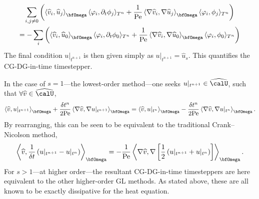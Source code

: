 \begin{example}
\begin{align}
        \end{align}
        \vspace{-8mm}
        \begin{multline}
            \sum_{i, j \neq 0}\left(\left\langle\widehat{v}_{i}, \widehat{u}_{j}\right\rangle_{\bfOmega}\langle\varphi_{i}, \partial_{t}\phi_{j}\rangle_{T^{n}} + \frac{1}{\rmPe}\left\langle\nabla\widehat{v}_{i}, \nabla\widehat{u}_{j}\right\rangle_{\bfOmega}\langle\varphi_{i}, \phi_{j}\rangle_{T^{n}}\right)  \\
            =  - \sum_{i}\left(\left\langle\widehat{v}_{i}, \widehat{u}_{0}\right\rangle_{\bfOmega}\langle\varphi_{i}, \partial_{t}\phi_{0}\rangle_{T^{n}} + \frac{1}{\rmPe}\left\langle\nabla\widehat{v}_{i}, \nabla\widehat{u}_{0}\right\rangle_{\bfOmega}\langle\varphi_{i}, \phi_{0}\rangle_{T^{n}}\right)
        \end{multline}
        The final condition $u|_{t^{n + 1}}$ is then given simply as $u|_{t^{n + 1}}  =  \widehat{u}_{s}$. This quantifies the CG-DG-in-time timestepper.
    \end{example}

    In the case of $s  =  1$---the lowest-order method---one seeks $u|_{t^{n + 1}}  \in  \widehat{\calU}$, such that $\forall \widehat{v}  \in  \widehat{\calU}$,
    \begin{equation}
        \left\langle\widehat{v}, u|_{t^{n + 1}}\right\rangle_{\bfOmega} + \frac{\delta t^{n}}{2\rmPe}\left\langle\nabla\widehat{v}, \nabla u|_{t^{n + 1}}\right\rangle_{\bfOmega}  =  \left\langle\widehat{v}, u|_{t^{n}}\right\rangle_{\bfOmega} - \frac{\delta t^{n}}{2\rmPe}\left\langle\nabla\widehat{v}, \nabla u|_{t^{n}}\right\rangle_{\bfOmega}.
    \end{equation}
    By rearranging, this can be seen to be equivalent to the traditional Crank--Nicolson method,
    \begin{equation}
        \left\langle\widehat{v}, \frac{1}{\delta t}\left(u|_{t^{n + 1}} - u|_{t^{n}}\right)\right\rangle_{\bfOmega}  =  - \frac{1}{\rmPe}\left\langle\nabla\widehat{v}, \nabla\left[\frac{1}{2}\left(u|_{t^{n + 1}} + u|_{t^{n}}\right)\right]\right\rangle_{\bfOmega}.
    \end{equation}
    For $s  >  1$---at higher order---the resultant CG-DG-in-time timesteppers are here equivalent to the other higher-order GL methods. As stated above, these are all known to be exactly dissipative for the heat equation.
    
